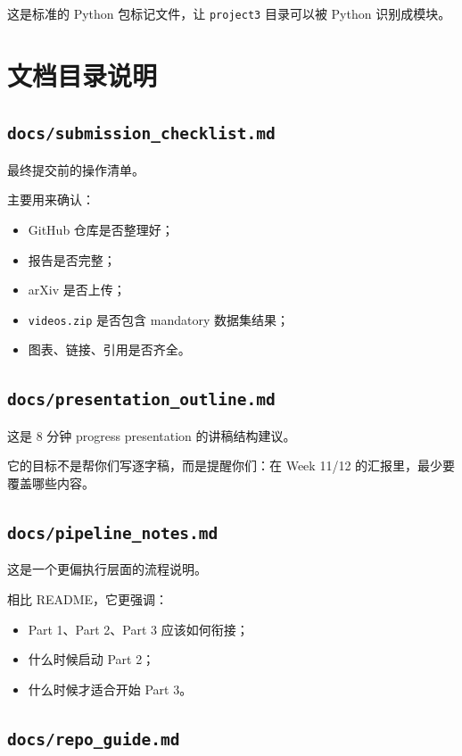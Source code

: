 \documentclass[11pt,a4paper,fontset=none]{ctexart}
\begin{document}
这是标准的 Python 包标记文件，让 \texttt{project3} 目录可以被 Python 识别成模块。

\section{文档目录说明}

\subsection{\texttt{docs/submission\_checklist.md}}

最终提交前的操作清单。

主要用来确认：

\begin{itemize}
  \item GitHub 仓库是否整理好；
  \item 报告是否完整；
  \item arXiv 是否上传；
  \item \texttt{videos.zip} 是否包含 mandatory 数据集结果；
  \item 图表、链接、引用是否齐全。
\end{itemize}

\subsection{\texttt{docs/presentation\_outline.md}}

这是 8 分钟 progress presentation 的讲稿结构建议。

它的目标不是帮你们写逐字稿，而是提醒你们：在 Week 11/12 的汇报里，最少要覆盖哪些内容。

\subsection{\texttt{docs/pipeline\_notes.md}}

这是一个更偏执行层面的流程说明。

相比 README，它更强调：

\begin{itemize}
  \item Part 1、Part 2、Part 3 应该如何衔接；
  \item 什么时候启动 Part 2；
  \item 什么时候才适合开始 Part 3。
\end{itemize}

\subsection{\texttt{docs/repo\_guide.md}}
\end{document}
